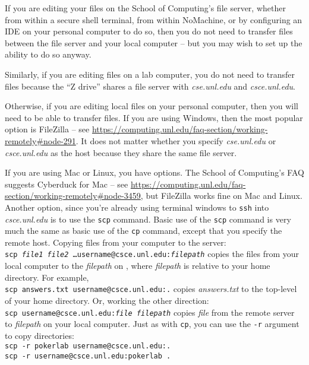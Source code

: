 If you are editing your files on the School of Computing's file server, whether from within a secure shell terminal, from within NoMachine, or by configuring an IDE on your personal computer to do so, then you do not need to transfer files between the file server and your local computer -- but you may wish to set up the ability to do so anyway.

Similarly, if you are editing files on a lab computer, you do not need to transfer files because the ``Z drive'' shares a file server with \textit{cse.unl.edu} and \textit{csce.unl.edu}.

Otherwise, if you are editing local files on your personal computer, then you will need to be able to transfer files.
If you are using Windows, then the most popular option is FileZilla -- see \url{https://computing.unl.edu/faq-section/working-remotely#node-291}.
It does not matter whether you specify \textit{cse.unl.edu} or \textit{csce.unl.edu} as the host because they share the same file server.

If you are using Mac or Linux, you have options.
The School of Computing's FAQ suggests Cyberduck for Mac -- see \url{https://computing.unl.edu/faq-section/working-remotely#node-3459}, but FileZilla works fine on Mac and Linux.
Another option, since you're already using terminal windows to \texttt{ssh} into \textit{csce.unl.edu} is to use the \texttt{scp} command.
Basic use of the \texttt{scp} command is very much the same as basic use of the \texttt{cp} command, except that you specify the remote host.
Copying files from your computer to the server: \\
\texttt{scp \textit{file1} \textit{file2} \dots username@csce.unl.edu:\textit{filepath}} copies the files from your local computer to the \textit{filepath} on \runtimeenvironment, where \textit{filepath} is relative to your home directory.
For example, \\
\texttt{scp answers.txt username@csce.unl.edu:.} copies \textit{answers.txt} to the top-level of your home directory.
Or, working the other direction: \\
\texttt{scp username@csce.unl.edu:\textit{file} \textit{filepath}} copies \textit{file} from the remote server to \textit{filepath} on your local computer.
Just as with \texttt{cp}, you can use the \texttt{-r} argument to copy directories: \\
\texttt{scp -r pokerlab username@csce.unl.edu:.} \\
\texttt{scp -r username@csce.unl.edu:pokerlab .}
